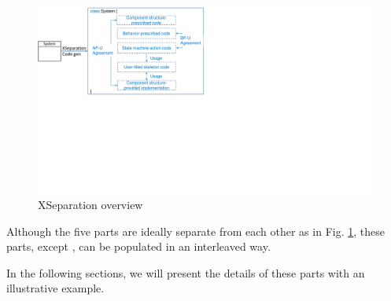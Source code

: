 \begin{figure}
	\centering
	\includegraphics[clip, trim=0cm 10cm 16.8cm 0cm, width=\columnwidth]{figures/xseparationoverview.pdf}
	\caption{XSeparation overview} 
	\label{fig:xseparationoverview}
\end{figure}

Although the five parts are ideally separate from each other as in Fig. \ref{fig:xseparationoverview}, these parts, except , can be populated in an interleaved way.

In the following sections, we will present the details of these parts with an illustrative example.

%
